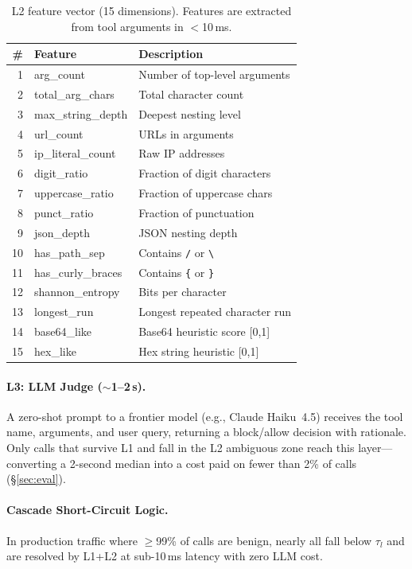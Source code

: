 \documentclass[sigplan,review,anonymous]{acmart}
\begin{document}
\begin{table}[t]
\centering
\footnotesize
\caption{L2 feature vector (15 dimensions). Features are extracted from tool arguments in $<$10\,ms.}
\vspace{-0.1in}
\label{tab:features}
\setlength{\tabcolsep}{3pt}
\begin{tabular}{rll}
\toprule
\# & Feature & Description \\
\midrule
1 & arg\_count & Number of top-level arguments \\
2 & total\_arg\_chars & Total character count \\
3 & max\_string\_depth & Deepest nesting level \\
4 & url\_count & URLs in arguments \\
5 & ip\_literal\_count & Raw IP addresses \\
6 & digit\_ratio & Fraction of digit characters \\
7 & uppercase\_ratio & Fraction of uppercase chars \\
8 & punct\_ratio & Fraction of punctuation \\
9 & json\_depth & JSON nesting depth \\
10 & has\_path\_sep & Contains \texttt{/} or \texttt{\textbackslash} \\
11 & has\_curly\_braces & Contains \texttt{\{} or \texttt{\}} \\
12 & shannon\_entropy & Bits per character \\
13 & longest\_run & Longest repeated character run \\
14 & base64\_like & Base64 heuristic score [0,1] \\
15 & hex\_like & Hex string heuristic [0,1] \\
\bottomrule
\end{tabular}
\vspace{-0.15in}
\end{table}

\paragraph{L3: LLM Judge ($\sim$1--2\,s).}
A zero-shot prompt to a frontier model (e.g., Claude Haiku~4.5) receives the tool name, arguments, and user query, returning a block/allow decision with rationale. Only calls that survive L1 and fall in the L2 ambiguous zone reach this layer---converting a 2-second median into a cost paid on fewer than 2\% of calls (\S\ref{sec:eval}).

\paragraph{Cascade Short-Circuit Logic.}
\label{sec:cascade}
In production traffic where $\ge$99\% of calls are benign, nearly all fall below $\tau_l$ and are resolved by L1+L2 at sub-10\,ms latency with zero LLM cost.
\end{document}
